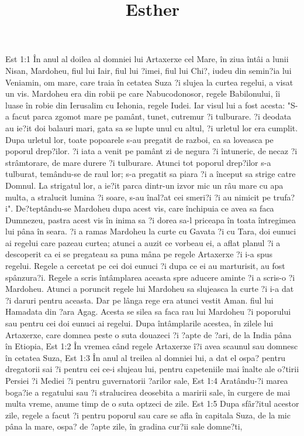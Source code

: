 

\title{Esther}

Est 1:1  În anul al doilea al domniei lui Artaxerxe cel Mare, în ziua întâi a lunii Nisan, Mardoheu, fiul lui Iair, fiul lui ?imei, fiul lui Chi?, iudeu din semin?ia lui Veniamin, om mare, care traia în cetatea Suza ?i slujea la curtea regelui, a visat un vis. Mardoheu era din robii pe care Nabucodonosor, regele Babilonului, îi luase în robie din Ierusalim cu Iehonia, regele Iudei. Iar visul lui a fost acesta: "S-a facut parca zgomot mare pe pamânt, tunet, cutremur ?i tulburare. ?i deodata au ie?it doi balauri mari, gata sa se lupte unul cu altul, ?i urletul lor era cumplit. Dupa urletul lor, toate popoarele s-au pregatit de razboi, ca sa loveasca pe poporul drep?ilor. ?i iata a venit pe pamânt zi de negura ?i întuneric, de necaz ?i strâmtorare, de mare durere ?i tulburare. Atunci tot poporul drep?ilor s-a tulburat, temându-se de raul lor; s-a pregatit sa piara ?i a început sa strige catre Domnul. La strigatul lor, a ie?it parca dintr-un izvor mic un râu mare cu apa multa, a stralucit lumina ?i soare, s-au înal?at cei smeri?i ?i au nimicit pe trufa?i". De?teptându-se Mardoheu dupa acest vis, care închipuia ce avea sa faca Dumnezeu, pastra acest vis în inima sa ?i dorea sa-l priceapa în toata întregimea lui pâna în seara. ?i a ramas Mardoheu la curte cu Gavata ?i cu Tara, doi eunuci ai regelui care pazeau curtea; atunci a auzit ce vorbeau ei, a aflat planul ?i a descoperit ca ei se pregateau sa puna mâna pe regele Artaxerxe ?i i-a spus regelui. Regele a cercetat pe cei doi eunuci ?i dupa ce ei au marturisit, au fost spânzura?i. Regele a scris întâmplarea aceasta spre aducere aminte ?i a scris-o ?i Mardoheu. Atunci a poruncit regele lui Mardoheu sa slujeasca la curte ?i i-a dat ?i daruri pentru aceasta. Dar pe lânga rege era atunci vestit Aman. fiul lui Hamadata din ?ara Agag. Acesta se silea sa faca rau lui Mardoheu ?i poporului sau pentru cei doi eunuci ai regelui. Dupa întâmplarile acestea, în zilele lui Artaxerxe, care domnea peste o suta douazeci ?i ?apte de ?ari, de la India pâna în Etiopia,
Est 1:2  În vremea când regele Artaxerxe î?i avea scaunul sau domnesc în cetatea Suza,
Est 1:3  În anul al treilea al domniei lui, a dat el ospa? pentru dregatorii sai ?i pentru cei ce-i slujeau lui, pentru capeteniile mai înalte ale o?tirii Persiei ?i Mediei ?i pentru guvernatorii ?arilor sale,
Est 1:4  Aratându-?i marea boga?ie a regatului sau ?i stralucirea deosebita a maririi sale, în curgere de mai multa vreme, anume timp de o suta optzeci de zile.
Est 1:5  Dupa sfâr?itul acestor zile, regele a facut ?i pentru poporul sau care se afla în capitala Suza, de la mic pâna la mare, ospa? de ?apte zile, în gradina cur?ii sale domne?ti,
